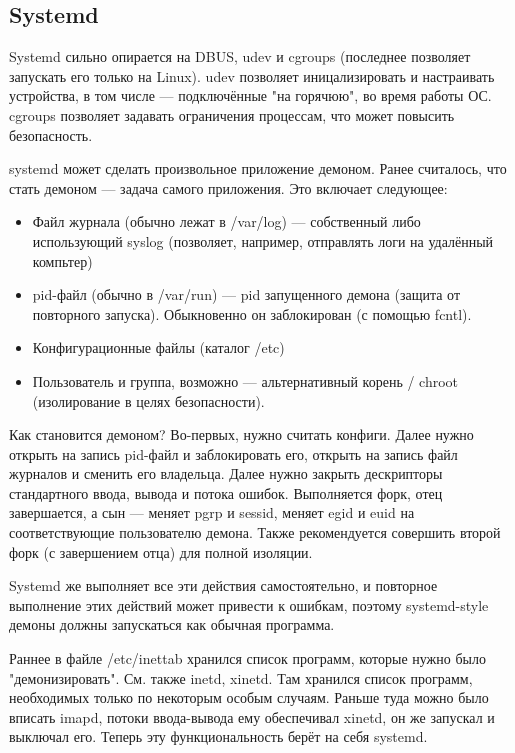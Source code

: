 \documentclass[main]{subfiles}
\begin{document}
\subsection{Systemd}
Systemd сильно опирается на DBUS, udev и cgroups (последнее позволяет запускать
его только на Linux). udev позволяет иницализировать и настраивать устройства,
в том числе --- подключённые "на горячюю", во время работы ОС.
cgroups позволяет задавать ограничения процессам, что может повысить безопасность.

systemd может сделать произвольное приложение демоном. Ранее считалось, что стать
демоном --- задача самого приложения. Это включает следующее:
\begin{itemize}
\item Файл журнала (обычно лежат в /var/log) --- собственный либо использующий
syslog (позволяет, например, отправлять логи на удалённый компьтер)
\item pid-файл (обычно в /var/run) --- pid запущенного демона
(защита от повторного запуска). Обыкновенно он заблокирован (с помощью fcntl).
\item Конфигурационные файлы (каталог /etc)
\item Пользователь и группа, возможно --- альтернативный корень / chroot
(изолирование в целях безопасности).
\end{itemize}
Как становится демоном?
Во-первых, нужно считать конфиги. Далее нужно открыть на запись pid-файл
и заблокировать его, открыть на запись файл журналов и сменить его владельца.
Далее нужно закрыть дескрипторы стандартного ввода, вывода и потока ошибок.
Выполняется форк, отец завершается, а сын --- меняет pgrp и sessid,
меняет egid и euid на соответствующие пользователю демона.
Также рекомендуется совершить второй форк (с завершением отца)
для полной изоляции.

Systemd же выполняет все эти действия самостоятельно, и повторное выполнение
этих действий может привести к ошибкам, поэтому systemd-style демоны должны
запускаться как обычная программа.

Раннее в файле /etc/inettab хранился список программ, которые нужно было "демонизировать".
См. также inetd, xinetd. Там хранился список программ, необходимых только по некоторым
особым случаям. Раньше туда можно было вписать imapd, потоки ввода-вывода ему обеспечивал
xinetd, он же запускал и выключал его. Теперь эту функциональность берёт на себя systemd.
\end{document}
